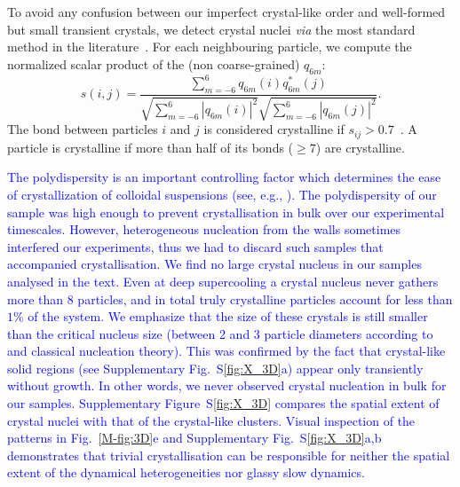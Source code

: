 \documentclass[prl,twocolumn,notitlepage]{revtex4-1}
\begin{document}
To avoid any confusion between our imperfect crystal-like order and well-formed but small transient crystals, we detect crystal nuclei \emph{via} the most standard method in the literature~\cite{ReintenWolde1996, Zaccarelli2009}. For each neighbouring particle, we compute the normalized scalar product of the (non coarse-grained) $q_{6 m}$:
\begin{equation}
	s(i,j) = \frac{
		\sum_{m=-6}^{6} q_{6 m}(i) q_{6 m}^{*}(j)
	}{
		\sqrt{\sum_{m=-6}^{6} |q_{6 m}(i)|^2} \sqrt{\sum_{m=-6}^{6} |q_{6 m}(j)|^2}
	}.
	\label{eq:boo_dot_product}
\end{equation}
The bond between particles $i$ and $j$ is considered crystalline if $s_{ij}>0.7$~\cite{Zaccarelli2009}. A particle is crystalline if more than half of its bonds ($\geq 7$) are crystalline. 

\textcolor{blue}{The polydispersity is an important controlling factor which determines the ease of crystallization of colloidal suspensions (see, e.g., \cite{Zaccarelli2009}). 
The polydispersity of our sample was high enough to prevent crystallisation in bulk over our experimental timescales. 
However, heterogeneous nucleation from the walls sometimes interfered our experiments, thus we had to discard such samples that accompanied crystallisation. 
We find no large crystal nucleus in our samples analysed in the text. Even at deep supercooling a crystal nucleus never gathers more than 8 particles, and in total truly crystalline particles account for less than $1\%$ of the system. We emphasize that the size of these crystals is still smaller than the critical nucleus size (between 2 and 3 particle diameters according to~\cite{Auer2001} and classical nucleation theory). This was confirmed by the fact that crystal-like solid regions (see Supplementary Fig.~S\ref{fig:X_3D}a) appear only transiently without growth. In other words, we never observed crystal nucleation in bulk for our samples. Supplementary Figure~S\ref{fig:X_3D} compares the spatial extent of crystal nuclei with that of the crystal-like clusters. Visual inspection of the patterns in Fig.~\ref{M-fig:3D}e and Supplementary Fig.~S\ref{fig:X_3D}a,b  demonstrates that trivial crystallisation can be responsible for neither the spatial extent of the dynamical heterogeneities nor glassy slow dynamics.}
\end{document}
